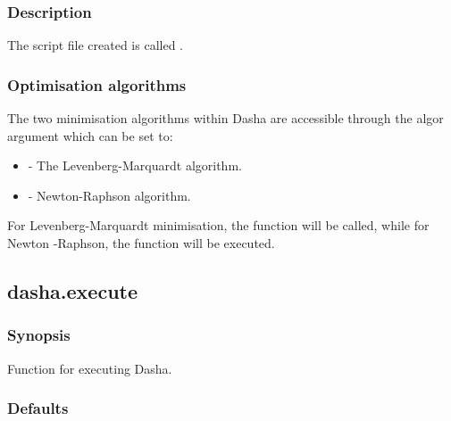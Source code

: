 \subsubsection{Description}

The script file created is called .



\subsubsection{Optimisation algorithms}

The two minimisation algorithms within Dasha are accessible through the algor argument which can be set to:


\begin{itemize}
\item[]  - The Levenberg-Marquardt algorithm. 
\item[]  - Newton-Raphson algorithm. 
\end{itemize}


For Levenberg-Marquardt minimisation, the function  will be called, while for Newton -Raphson, the function  will be executed.




\newpage

\subsection{dasha.execute}


\subsubsection{Synopsis}

Function for executing Dasha.



\subsubsection{Defaults}

